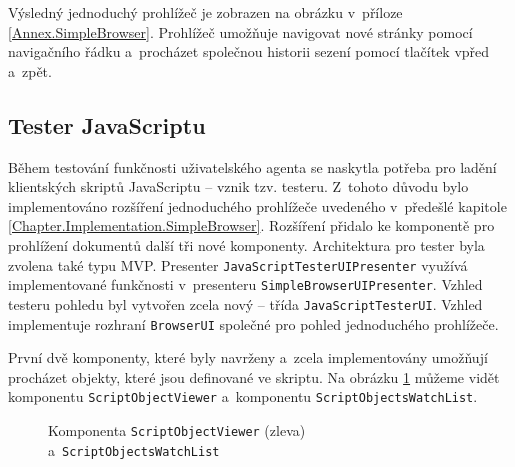 Výsledný jednoduchý prohlížeč je zobrazen na obrázku v~příloze \ref{Annex.SimpleBrowser}. Prohlížeč umožňuje navigovat nové stránky pomocí navigačního řádku a~procházet společnou historii sezení pomocí tlačítek vpřed a~zpět. 

\vspace{-0.3em}

\subsection{Tester JavaScriptu}
\label{Chapter.Implementation.JavaScriptTester}

Během testování funkčnosti uživatelského agenta se naskytla potřeba pro ladění klientských skriptů JavaScriptu -- vznik tzv. testeru. Z~tohoto důvodu bylo implementováno rozšíření jednoduchého prohlížeče uvedeného v~předešlé kapitole \ref{Chapter.Implementation.SimpleBrowser}. Rozšíření přidalo ke komponentě pro prohlížení dokumentů další tři nové komponenty. Architektura pro tester byla zvolena také typu MVP. Presenter \texttt{JavaScriptTesterUIPresenter} využívá implementované funkčnosti v~presenteru \texttt{SimpleBrowserUIPresenter}. Vzhled testeru pohledu byl vytvořen zcela nový -- třída \texttt{JavaScriptTesterUI}. Vzhled implementuje rozhraní \texttt{BrowserUI} společné pro pohled jednoduchého prohlížeče.

První dvě komponenty, které byly navrženy a~zcela implementovány umožňují procházet objekty, které jsou definované ve skriptu. Na obrázku \ref{Figure.ScriptObjectViewerAndWatchList} můžeme vidět komponentu \texttt{ScriptObjectViewer} a~komponentu \texttt{ScriptObjectsWatchList}. 

\begin{figure}[H]
  \begin{center}
    \caption{Komponenta \texttt{ScriptObjectViewer} (zleva) a~\texttt{ScriptObjectsWatchList}}
    \label{Figure.ScriptObjectViewerAndWatchList}
  \end{center}
\end{figure}

